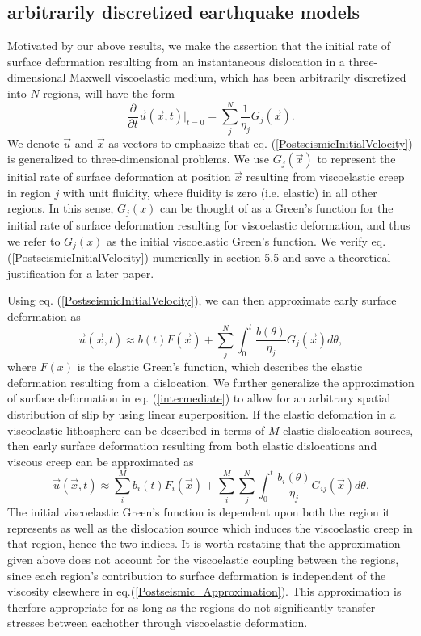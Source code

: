 \documentclass[extra]{gji}
\begin{document}
\subsection{arbitrarily discretized earthquake models}
Motivated by our above results, we make the assertion that the initial
rate of surface deformation resulting from an instantaneous
dislocation in a three-dimensional Maxwell viscoelastic
medium, which has been arbitrarily discretized into $N$ regions, will
have the form
\begin{equation}\label{PostseismicInitialVelocity}
  \frac{\partial}{\partial t}\vec{u}(\vec{x},t)\big|_{t=0} = \sum_j^N\frac{1}{\eta_j}G_j(\vec{x}).
\end{equation}
We denote $\vec{u}$ and $\vec{x}$ as vectors to emphasize that
eq. (\ref{PostseismicInitialVelocity}) is generalized to
three-dimensional problems.  We use $G_j(\vec{x})$ to represent the
initial rate of surface deformation at position $\vec{x}$ resulting
from viscoelastic creep in region $j$ with unit fluidity, where
fluidity is zero (i.e. elastic) in all other regions.  In this sense,
$G_j(x)$ can be thought of as a Green's function for the initial rate
of surface deformation resulting for viscoelastic deformation, and
thus we refer to $G_j(x)$ as the initial viscoelastic Green's
function.  We verify eq. (\ref{PostseismicInitialVelocity})
numerically in section 5.5 and save a theoretical justification for a
later paper.

Using eq. (\ref{PostseismicInitialVelocity}), we can then approximate
early surface deformation as
\begin{equation}\label{intermediate}
\vec{u}(\vec{x},t) \approx b(t)F(\vec{x}) + \sum_j^N\int_0^t
\frac{b(\theta)}{\eta_j}G_j(\vec{x}) d\theta,
\end{equation}
where $F(x)$ is the elastic Green's function, which describes the
elastic deformation resulting from a dislocation. We further
generalize the approximation of surface deformation in
eq. (\ref{intermediate}) to allow for an arbitrary spatial
distribution of slip by using linear superposition.  If the elastic
defomation in a viscoelastic lithosphere can be described in terms of
$M$ elastic dislocation sources, then early surface deformation
resulting from both elastic dislocations and viscous creep can be
approximated as
\begin{equation}\label{Postseismic_Approximation}
\vec{u}(\vec{x},t) \approx \sum_i^Mb_i(t)F_i(\vec{x}) +
\sum_i^M\sum_j^N\int_0^t\frac{b_i(\theta)}{\eta_j}G_{ij}(\vec{x}) d\theta.
\end{equation}
The initial viscoelastic Green's function is dependent upon both the
region it represents as well as the dislocation source which induces
the viscoelastic creep in that region, hence the two indices.  It is
worth restating that the approximation given above does not account
for the viscoelastic coupling between the regions, since each region's
contribution to surface deformation is independent of the viscosity
elsewhere in eq.(\ref{Postseismic_Approximation}).  This approximation
is therfore appropriate for as long as the regions do not
significantly transfer stresses between eachother through viscoelastic
deformation.
\end{document}
